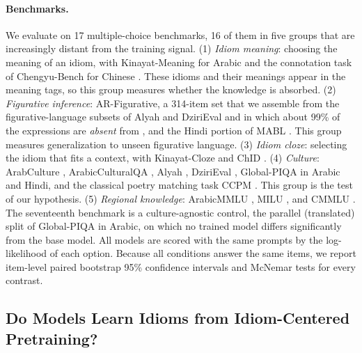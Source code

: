 \paragraph{Benchmarks.}
We evaluate on 17 multiple-choice benchmarks, 16 of them in five groups that are increasingly distant from the training signal.
(1) \textit{Idiom meaning}: choosing the meaning of an idiom, with Kinayat-Meaning for Arabic and the connotation task of Chengyu-Bench for Chinese \citep{kinayat2025,chengyubench2025}. These idioms and their meanings appear in the meaning tags, so this group measures whether the knowledge is absorbed.
(2) \textit{Figurative inference}: AR-Figurative, a 314-item set that we assemble from the figurative-language subsets of Alyah and DziriEval and in which about 99\% of the expressions are \textit{absent} from \dataname{}, and the Hindi portion of MABL \citep{kabra2023multi}. This group measures generalization to unseen figurative language.
(3) \textit{Idiom cloze}: selecting the idiom that fits a context, with Kinayat-Cloze and ChID \citep{zheng2019chid}.
(4) \textit{Culture}: ArabCulture \citep{sadallah2025arabculture}, ArabicCulturalQA \citep{arabicculturalqa2025}, Alyah \citep[Emirati culture;][]{alyah2025}, DziriEval \citep[Algerian culture;][]{dzirieval2025}, Global-PIQA \citep{chang2025global} in Arabic and Hindi, and the classical poetry matching task CCPM \citep{li2021ccpm}. This group is the test of our hypothesis.
(5) \textit{Regional knowledge}: ArabicMMLU \citep{koto2024arabicmmlu}, MILU \citep{verma2025milu}, and CMMLU \citep{li2023cmmlu}.
The seventeenth benchmark is a culture-agnostic control, the parallel (translated) split of Global-PIQA in Arabic, on which no trained model differs significantly from the base model.
All models are scored with the same prompts by the log-likelihood of each option. Because all conditions answer the same items, we report item-level paired bootstrap 95\% confidence intervals and McNemar tests for every contrast.

\subsection{Do Models Learn Idioms from Idiom-Centered Pretraining?}
\label{sec:results-idiom}



